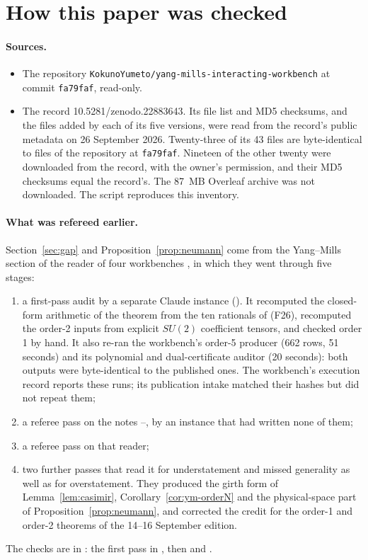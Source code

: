 \section{How this paper was checked}\label{app:verification}

\paragraph{Sources.}
\begin{itemize}
\item The repository \texttt{KokunoYumeto/yang-mills-interacting-workbench} at commit \texttt{fa79faf}, read-only.
\item The record 10.5281/zenodo.22883643. Its file list and MD5 checksums, and the files added by each of its five versions, were read from the record's public metadata on 26 September 2026. Twenty-three of its 43 files are byte-identical to files of the repository at \texttt{fa79faf}. Nineteen of the other twenty were downloaded from the record, with the owner's permission, and their MD5 checksums equal the record's. The 87~MB Overleaf archive was not downloaded. The script  reproduces this inventory.
\end{itemize}

\paragraph{What was refereed earlier.}
Section~\ref{sec:gap} and Proposition~\ref{prop:neumann} come from the Yang--Mills section of the reader of four workbenches \cite{WorkbenchReader}, in which they went through five stages:
\begin{enumerate}[label=\arabic*.]
\item a first-pass audit by a separate Claude instance (). It recomputed the closed-form arithmetic of the theorem from the ten rationals of (F26), recomputed the order-2 inputs from explicit $SU(2)$ coefficient tensors, and checked order 1 by hand. It also re-ran the workbench's order-5 producer (662 rows, 51 seconds) and its polynomial and dual-certificate auditor (20 seconds): both outputs were byte-identical to the published ones. The workbench's execution record reports these runs; its publication intake matched their hashes but did not repeat them;
\item a referee pass on the notes --, by an instance that had written none of them;
\item a referee pass on that reader;
\item two further passes that read it for understatement and missed generality as well as for overstatement. They produced the girth form of Lemma~\ref{lem:casimir}, Corollary~\ref{cor:ym-orderN} and the physical-space part of Proposition~\ref{prop:neumann}, and corrected the credit for the order-1 and order-2 theorems of the 14--16 September edition.
\end{enumerate}
The checks are in : the first pass in , then  and .

